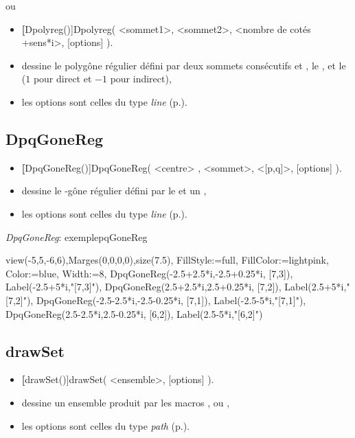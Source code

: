 \centerline{ou}

\begin{itemize}
 \item \util \textbf[Dpolyreg()]{Dpolyreg( <sommet1>, <sommet2>, <nombre de cotés +sens*i>, [options] )}.
 \item \desc dessine le polygône régulier défini par deux sommets consécutifs  et , le 
, et le  ($1$ pour direct et $-1$ pour indirect),
 \item les options sont celles du type \emph{line} (p.\pageref{typeline}).
\end{itemize}

\subsection{DpqGoneReg}\label{macDpqGoneReg}

\begin{itemize}
 \item \util \textbf[DpqGoneReg()]{DpqGoneReg( <centre> , <sommet>, <[p,q]>, [options] )}.
 \item \desc dessine le -gône régulier défini par le  et un ,
 \item les options sont celles du type \emph{line} (p.\pageref{typeline}).
\end{itemize} 

\begin{demo}{\textit{DpqGoneReg}: exemple}{pqGoneReg}
\begin{texgraph}[name=pqGoneReg]
view(-5,5,-6,6),Marges(0,0,0,0),size(7.5),
FillStyle:=full, FillColor:=lightpink,
Color:=blue, Width:=8,
DpqGoneReg(-2.5+2.5*i,-2.5+0.25*i, [7,3]),
Label(-2.5+5*i,"[7,3]"),
DpqGoneReg(2.5+2.5*i,2.5+0.25*i, [7,2]),
Label(2.5+5*i,"[7,2]"),
DpqGoneReg(-2.5-2.5*i,-2.5-0.25*i, [7,1]),
Label(-2.5-5*i,"[7,1]"),
DpqGoneReg(2.5-2.5*i,2.5-0.25*i, [6,2]),
Label(2.5-5*i,"[6,2]") 
\end{texgraph}
\end{demo}


\subsection{drawSet}\label{macdrawSet}

\begin{itemize}
 \item \util \textbf[drawSet()]{drawSet( <ensemble>, [options] )}.
 \item \desc dessine un ensemble produit par les macros ,  ou
,
 \item les options sont celles du type \emph{path} (p.\pageref{typepath}).
\end{itemize} 

